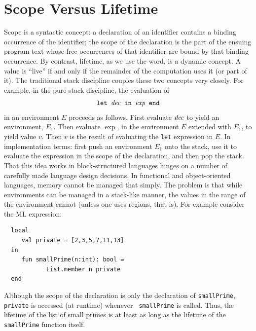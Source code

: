 \documentclass[12pt]{book}
\begin{document}
\section{Scope Versus Lifetime}
\label{scope.sec}
Scope
%
is a syntactic concept: a declaration of an identifier contains a
binding occurrence of the identifier; the scope of the declaration is
the part of the ensuing program text whose free occurrences of that
identifier are bound by that binding occurrence. By contrast,
lifetime, as we use the word, is a dynamic concept. A value is
``live'' if and only if the remainder of the computation uses it (or
part of it). The traditional
%
stack discipline couples these two concepts very closely. For example,
in the pure stack discipline, the evaluation of
$$\hbox{\tt let ${\it dec}$ in $\hbox{\it exp}$ end}$$
in an environment $E$ proceeds as
follows. First evaluate ${\it dec}$ to yield an environment, $E_1$. Then
evaluate $\exp$, in the environment $E$ extended with $E_1$, to yield
value $v$. Then $v$ is the result of evaluating the {\tt let}
expression in $E$. In implementation terms: first push an environment
$E_1$ onto the stack, use it to evaluate the expression in the scope
of the declaration, and then pop the stack. That this idea works in
%
block-structured languages hinges on a number of carefully made
language design decisions. In functional and object-oriented
languages, memory cannot be managed that simply. The problem is that
while environments can be managed in a stack-like manner, the values
in the range of the environment cannot (unless one uses regions, that
is). For example consider the ML expression:
\begin{verbatim}
  local
     val private = [2,3,5,7,11,13]
  in
     fun smallPrime(n:int): bool =
            List.member n private
  end
\end{verbatim}

Although the scope of the declaration is only the declaration of
%
{\tt smallPrime}, {\tt private} is accessed (at runtime) whenever {\tt
  smallPrime} is called.  Thus, the lifetime of the list of small
primes is at least as long as the lifetime of the {\tt smallPrime}
function itself.
\end{document}
